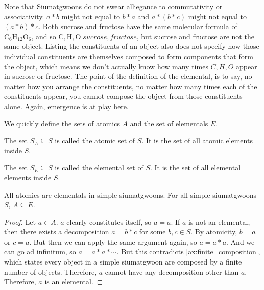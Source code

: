 Note that Siumatgwoons do not swear alliegance to commutativity or associativity. $a*b$ might not equal to $b*a$ and $a*(b*c)$ might not equal to $(a*b)*c$. Both sucrose and fructose have the same molecular formula of $\text{C}_6\text{H}_{12}\text{O}_6$, and so $\text{C}, \text{H}, \text{O} | sucrose, fructose$, but sucrose and fructose are not the same object. Listing the constituents of an object also does not specify how those individual constituents are themselves composed to form components that form the object, which means we don't actually know how many times $C, H, O$ appear in sucrose or fructose. The point of the definition of the elemental, is to say, no matter how you arrange the constituents, no matter how many times each of the constituents appear, you cannot compose the object from those constituents alone. Again, emergence is at play here.



We quickly define the sets of atomics $A$ and the set of elementals $E$.

\begin{definition}\label{def:atomic-set}
    The set $S_A \subseteq S$ is called the atomic set of $S$. It is the set of all atomic elements inside $S$.
\end{definition}

\begin{definition}\label{def:elemental-set}
    The set $S_E \subseteq S$ is called the elemental set of $S$. It is the set of all elemental elements inside $S$.
\end{definition}


\begin{lemma}\label{def:atomics-are-elementals-in-simple-siumatgwoons}
    All atomics are elementals in simple siumatgwoons. For all simple siumatgwoons $S$, $A \subseteq E$.
\end{lemma}
\begin{proof}
    Let $a \in A$. $a$ clearly constitutes itself, so $a=a$. If $a$ is not an elemental, then there exists a decomposition $a=b*c$ for some $b,c \in S$. By atomicity, $b=a$ or $c=a$. But then we can apply the same argument again, so $a=a*a$. And we can go ad infinitum, so $a=a*a*\cdots$. But this contradicts \ref{ax:finite_composition}, which states every object in a simple siumatgwoon are composed by a finite number of objects. Therefore, $a$ cannot have any decomposition other than $a$. Therefore, $a$ is an elemental.
\end{proof}



